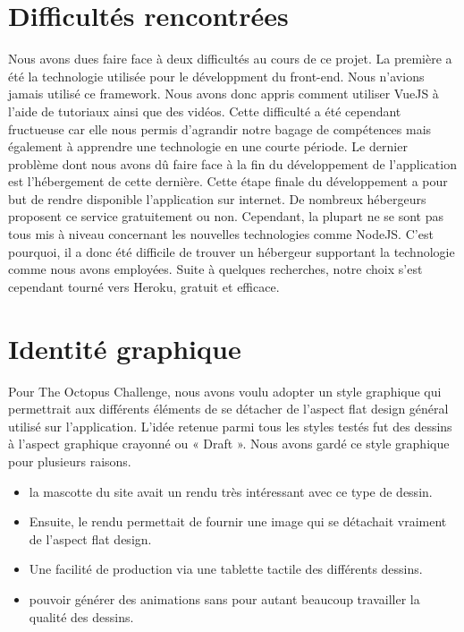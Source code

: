 \documentclass[a4paper,11pt, oneside]{book}
\def\appName{The Octopus Challenge}
\begin{document}
\section{Difficultés rencontrées}

Nous avons dues faire face à deux difficultés au cours de ce projet. La première a été la technologie utilisée pour le développment du front-end. Nous n'avions jamais utilisé ce framework.
Nous avons donc appris comment utiliser VueJS à l'aide de tutoriaux ainsi que des vidéos. Cette difficulté a été cependant fructueuse car elle nous permis d'agrandir notre bagage de compétences
mais également à apprendre une technologie en une courte période.
Le dernier problème dont nous avons dû faire face à la fin du développement de l'application est l'hébergement de cette dernière. Cette étape finale du développement a pour but de
rendre disponible l'application sur internet. De nombreux hébergeurs proposent ce service gratuitement ou non. Cependant, la plupart ne se sont pas tous mis à niveau concernant
les nouvelles technologies comme NodeJS. C'est pourquoi, il a donc été difficile de trouver un hébergeur supportant la technologie comme nous avons employées. Suite à quelques recherches, notre choix s'est cependant tourné vers Heroku,
gratuit et efficace.\\



\section{Identité graphique}
Pour \appName, nous avons voulu adopter un style graphique qui permettrait aux différents éléments de se détacher de l’aspect flat design général utilisé sur l’application.
L’idée retenue parmi tous les styles testés fut des dessins à l’aspect graphique crayonné ou « Draft ».
Nous avons gardé ce style graphique pour plusieurs raisons.
\begin{itemize}
	\item la mascotte du site avait un rendu très intéressant avec ce type de dessin.
	\item Ensuite, le rendu permettait de fournir une image qui se détachait vraiment de l’aspect flat design.
	\item Une facilité de production via une tablette tactile des différents dessins.
	\item pouvoir générer des animations sans pour autant beaucoup travailler la qualité des dessins.
\end{itemize}
\end{document}
